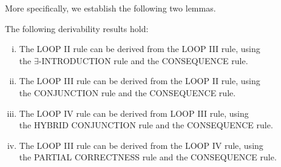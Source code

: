 \documentclass[runningheads]{llncs}       %
\begin{document}
More specifically, we establish the following two lemmas.

\begin{lemma}[Derivability]
  \label{lem:derivability}
The following derivability results hold:

\begin{enumerate} [(i)]
   \item The {\rm LOOP II} rule can be derived from the {\rm LOOP III} rule, using \\
   the  $\exists$-{\rm INTRODUCTION} rule and the {\rm CONSEQUENCE} rule.
   
    \vspace{2mm}

   \item The {\rm LOOP III} rule can be derived from the {\rm LOOP II} rule, using \\
   the {\rm CONJUNCTION} rule and the {\rm CONSEQUENCE} rule.
   
    \vspace{2mm}

   \item The {\rm LOOP IV} rule can be derived from {\rm LOOP III} rule, using \\
   the  {\rm HYBRID CONJUNCTION} rule and the {\rm CONSEQUENCE} rule.
   
    \vspace{2mm}

   \item The {\rm LOOP III} rule can be derived from the {\rm LOOP IV} rule, using \\
   the {\rm PARTIAL CORRECTNESS} rule and the {\rm CONSEQUENCE} rule.
   

   

   
\end{enumerate}

\end{lemma}
\end{document}
